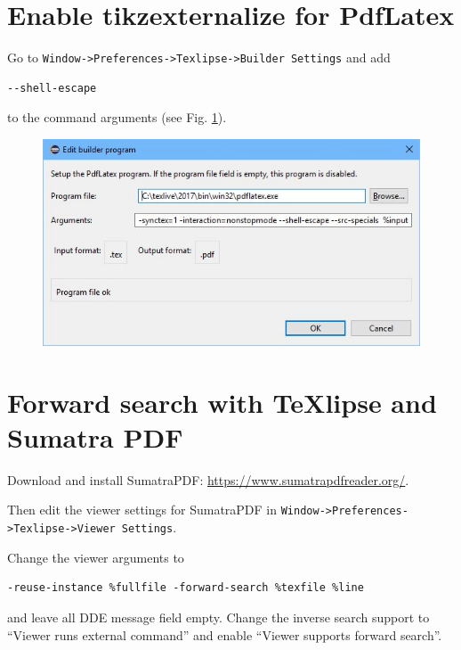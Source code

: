 \begin{otherlanguage}{english}
\section{Enable tikzexternalize for PdfLatex}

Go to \texttt{Window->Preferences->Texlipse->Builder Settings} and add 
%
\begin{verbatim}
--shell-escape
\end{verbatim}
%
to the command arguments (see Fig. \ref{fig:builder_settings}).
%
\begin{figure}[htb]
	\centering
	\includegraphics[scale=0.40]{images/PdfLatex_settings.jpg}
	\label{fig:builder_settings}
\end{figure}

\section{Forward search with TeXlipse and Sumatra PDF}

Download and install SumatraPDF: \url{https://www.sumatrapdfreader.org/}.

Then edit the viewer settings for SumatraPDF in \texttt{Window->Preferences->Texlipse->Viewer Settings}.

Change the viewer arguments to
%
\begin{verbatim}
-reuse-instance %fullfile -forward-search %texfile %line
\end{verbatim}
%
and leave all DDE message field empty.
Change the inverse search support to "`Viewer runs external command"' and enable "`Viewer supports forward search"'.


\end{otherlanguage}
